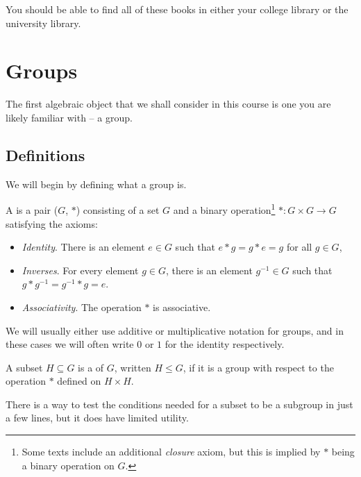\documentclass[a4paper]{scrreprt}
\begin{document}
You should be able to find all of these books in either your college library or the university library.


\clearpage


\chapter{Groups}

The first algebraic object that we shall consider in this course is one you are likely familiar with -- a group. 

\section{Definitions}

We will begin by defining what a group is.

\begin{definition}[Group]
	A  is a pair ($G$, $*$) consisting of a set $G$ and a binary operation\footnote{Some texts include an additional \emph{closure} axiom, but this is implied by $*$ being a binary operation on $G$.} $* : G \times G \rightarrow G$ satisfying the axioms:
	\begin{itemize}
		\item \emph{Identity}. There is an element $e \in G$ such that $e * g = g * e = g$ for all $g \in G$,
		\item \emph{Inverses}. For every element $g \in G$, there is an element $g^{-1} \in G$ such that $g * g^{-1} = g^{-1} * g = e$.
		\item \emph{Associativity}. The operation $*$ is associative.
	\end{itemize}
\end{definition}

\begin{remark}
	We will usually either use additive or multiplicative notation for groups, and in these cases we will often write $0$ or $1$ for the identity respectively.
\end{remark}

\begin{definition}[Subgroup]
	A subset $H \subseteq G$ is a  of $G$, written $H \leq G$, if it is a group with respect to the operation $*$ defined on $H \times H$.
\end{definition}

There is a way to test the conditions needed for a subset to be a subgroup in just a few lines, but it does have limited utility.
\end{document}
